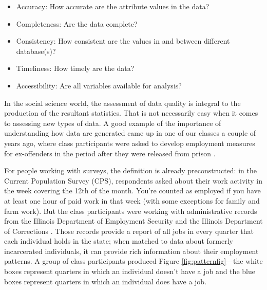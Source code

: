 \documentclass[]{krantz}
\providecommand{\tightlist}{%
  \setlength{\itemsep}{0pt}\setlength{\parskip}{0pt}}
\begin{document}
\begin{itemize}
\tightlist
\item
  Accuracy: How accurate are the attribute values in the data?
\item
  Completeness: Are the data complete?
\item
  Consistency: How consistent are the values in and between different
  database(s)?
\item
  Timeliness: How timely are the data?
\item
  Accessibility: Are all variables available for analysis?
\end{itemize}

In the social science world, the assessment of data quality is integral
to the production of the resultant statistics. That is not necessarily
easy when it comes to assessing new types of data. A good example of the
importance of understanding how data are generated came up in one of our
classes a couple of years ago, where class participants were asked to
develop employment measures for ex-offenders in the period after they
were released from prison \citep{Kreuter2019Change}.

For people working with surveys, the definition is already
preconstructed: in the Current Population Survey (CPS), respondents
asked about their work activity in the week covering the 12th of the
month. You're counted as employed if you have at least one hour of paid
work in that week (with some exceptions for family and farm work). But
the class participants were working with administrative records from the
Illinois Department of Employment Security and the Illinois Department
of Corrections \citep{Kreuter2019Change}. Those records provide a report
of all jobs in every quarter that each individual holds in the state;
when matched to data about formerly incarcerated individuals, it can
provide rich information about their employment patterns. A group of
class participants produced Figure \ref{fig:patternfig}---the white
boxes represent quarters in which an individual doesn't have a job and
the blue boxes represent quarters in which an individual does have a
job.
\end{document}
